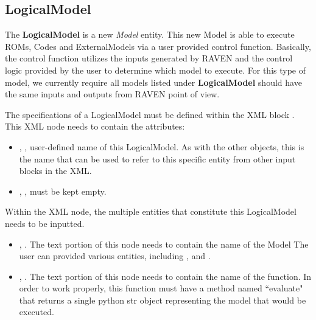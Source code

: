 %
%

\subsection{LogicalModel}
\label{subsec:models_LogicalModel}
The \textbf{LogicalModel} is a new \textit{Model} entity. This new Model is able to execute ROMs,
Codes and ExternalModels via a user provided control function. Basically, the control function
utilizes the inputs generated by RAVEN and the control logic provided by the user to determine which
model to execute.
\nb For this type of model, we currently require all models listed under \textbf{LogicalModel} should
have the same inputs and outputs from RAVEN point of view.

The specifications of a LogicalModel must be defined within the XML block
.
%
This XML node needs to contain the attributes:

\vspace{-5mm}
\begin{itemize}
  \itemsep0em
  \item {}, , user-defined name
  of this LogicalModel.
  \nb As with the other objects, this is the name that can be used to refer to
  this specific entity from other input blocks in the XML.
  \item {}, , must be kept
  empty.
\end{itemize}
\vspace{-5mm}

Within the  XML node, the multiple entities that constitute
this LogicalModel needs to be inputted.

\begin{itemize}
  \item {}, .
  The text portion of this node needs to contain the name of the Model
  \nb The user can provided various  entities, including ,
   and .

  \item {}, .
  The text portion of this node needs to contain the name of the function.
  \nb In order to work properly, this function must have a method named ``evaluate"
  that returns a single python str object representing the model that would be
  executed.
\end{itemize}

